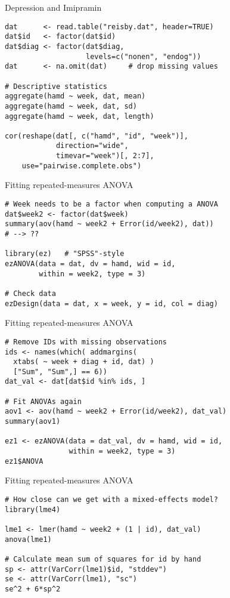 \documentclass{beamer}
\begin{document}
{

\begin{frame}[fragile]{Depression and Imipramin}
  \begin{lstlisting}
dat      <- read.table("reisby.dat", header=TRUE)
dat$id   <- factor(dat$id)
dat$diag <- factor(dat$diag, 
                   levels=c("nonen", "endog"))
dat      <- na.omit(dat)     # drop missing values

# Descriptive statistics
aggregate(hamd ~ week, dat, mean)
aggregate(hamd ~ week, dat, sd)
aggregate(hamd ~ week, dat, length)

cor(reshape(dat[, c("hamd", "id", "week")], 
            direction="wide",
            timevar="week")[, 2:7],
    use="pairwise.complete.obs")
  \end{lstlisting}
\end{frame}

\begin{frame}[fragile]{Fitting repeated-measures ANOVA}
  \begin{lstlisting}
# Week needs to be a factor when computing a ANOVA
dat$week2 <- factor(dat$week)
summary(aov(hamd ~ week2 + Error(id/week2), dat))
# --> ?? 

library(ez)   # "SPSS"-style
ezANOVA(data = dat, dv = hamd, wid = id,
        within = week2, type = 3)

# Check data
ezDesign(data = dat, x = week, y = id, col = diag)
  \end{lstlisting}
\end{frame}

\begin{frame}[fragile]{Fitting repeated-measures ANOVA}
  \begin{lstlisting}
# Remove IDs with missing observations
ids <- names(which( addmargins(
  xtabs( ~ week + diag + id, dat) )
  ["Sum", "Sum",] == 6))
dat_val <- dat[dat$id %in% ids, ]

# Fit ANOVAs again
aov1 <- aov(hamd ~ week2 + Error(id/week2), dat_val)
summary(aov1)

ez1 <- ezANOVA(data = dat_val, dv = hamd, wid = id,
               within = week2, type = 3)
ez1$ANOVA
  \end{lstlisting}
\end{frame}

\begin{frame}[fragile]{Fitting repeated-measures ANOVA}
  \begin{lstlisting}
# How close can we get with a mixed-effects model?
library(lme4)

lme1 <- lmer(hamd ~ week2 + (1 | id), dat_val)
anova(lme1)

# Calculate mean sum of squares for id by hand
sp <- attr(VarCorr(lme1)$id, "stddev")
se <- attr(VarCorr(lme1), "sc")
se^2 + 6*sp^2
  \end{lstlisting}
\end{frame}

}
\end{document}
